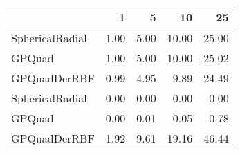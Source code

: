 \begin{tabular}{lrrrr}
\toprule
{} &    1 &    5 &    10 &    25 \\
\midrule
SphericalRadial & 1.00 & 5.00 & 10.00 & 25.00 \\
GPQuad          & 1.00 & 5.00 & 10.00 & 25.02 \\
GPQuadDerRBF    & 0.99 & 4.95 &  9.89 & 24.49 \\
SphericalRadial & 0.00 & 0.00 &  0.00 &  0.00 \\
GPQuad          & 0.00 & 0.01 &  0.05 &  0.78 \\
GPQuadDerRBF    & 1.92 & 9.61 & 19.16 & 46.44 \\
\bottomrule
\end{tabular}
